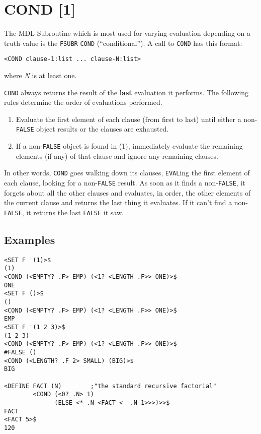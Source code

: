 \documentclass[a4paper]{scrbook}
\providecommand{\tightlist}{%
  \setlength{\itemsep}{0pt}\setlength{\parskip}{0pt}}
\begin{document}
\section{COND {[}1{]}}\label{cond-1}

The MDL Subroutine which is most used for varying evaluation depending on a truth value is the
\texttt{FSUBR} \texttt{COND} (``conditional''). A call to \texttt{COND}
has this format:

\begin{verbatim}
<COND clause-1:list ... clause-N:list>
\end{verbatim}

where \emph{N} is at least one.

\texttt{COND} always returns the result of the \textbf{last} evaluation it performs. The following rules determine the
order of evaluations performed.

\begin{enumerate}
\def\labelenumi{\arabic{enumi}.}
\tightlist
\item
  Evaluate the first element of each clause (from first to last) until either a non-\texttt{FALSE} object results or the
  clauses are exhausted.
\item
  If a non-\texttt{FALSE} object is found in (1), immediately evaluate the remaining elements (if any) of that clause and
  ignore any remaining clauses.
\end{enumerate}

In other words, \texttt{COND} goes walking down its clauses, \texttt{EVAL}ing the first element of each clause, looking for
a non-\texttt{FALSE} result. As soon as it finds a non-\texttt{FALSE}, it forgets about all the other clauses and
evaluates, in order, the other elements of the current clause and returns the last thing it evaluates. If it can't find a
non-\texttt{FALSE}, it returns the last \texttt{FALSE} it saw.

\subsection{Examples}\label{examples-2}

\begin{verbatim}
<SET F '(1)>$
(1)
<COND (<EMPTY? .F> EMP) (<1? <LENGTH .F>> ONE)>$
ONE
<SET F ()>$
()
<COND (<EMPTY? .F> EMP) (<1? <LENGTH .F>> ONE)>$
EMP
<SET F '(1 2 3)>$
(1 2 3)
<COND (<EMPTY? .F> EMP) (<1? <LENGTH .F>> ONE)>$
#FALSE ()
<COND (<LENGTH? .F 2> SMALL) (BIG)>$
BIG

<DEFINE FACT (N)        ;"the standard recursive factorial"
        <COND (<0? .N> 1)
              (ELSE <* .N <FACT <- .N 1>>>)>>$
FACT
<FACT 5>$
120
\end{verbatim}
\end{document}
